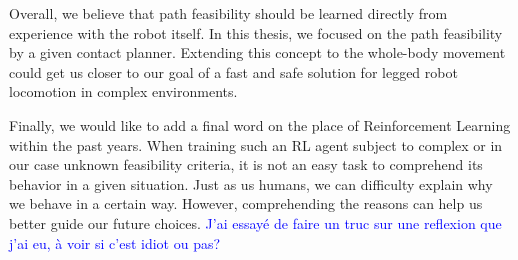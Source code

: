 Overall, we believe that path feasibility should be learned directly from experience with the robot itself.
In this thesis, we focused on the path feasibility by a given contact planner. Extending this concept to the whole-body movement could get us closer to our goal of a fast and safe solution for legged robot locomotion in complex environments.

Finally, we would like to add a final word on the place of Reinforcement Learning within the past years.
When training such an RL agent subject to complex or in our case unknown feasibility criteria, it is not an easy task to comprehend its behavior in a given situation.
Just as us humans, we can difficulty explain why we behave in a certain way. However, comprehending the reasons can help us better guide our future choices.
\textcolor{blue}{J'ai essayé de faire un truc sur une reflexion que j'ai eu, à voir si c'est idiot ou pas?}